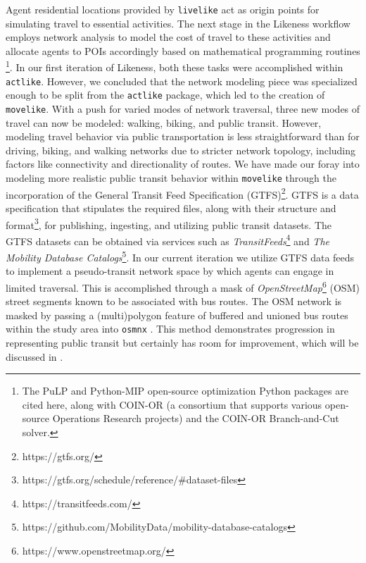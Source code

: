Agent residential locations provided by \texttt{livelike} act as origin points for simulating travel to essential activities. 
The next stage in the Likeness workflow employs network analysis to model the cost of travel to these activities \cite{OpenStreetMap, osmnx_CEUS_2017, foti_generalized_2012} and allocate agents to POIs accordingly based on mathematical programming routines \cite{mitchell_pulp_2011, santos_mixed_2020, lougee_coin_2003, forrest_coinorcbc_2023}\footnote{The PuLP and Python-MIP open-source optimization Python packages are cited here, along with COIN-OR (a consortium that supports various open-source Operations Research projects) and the COIN-OR Branch-and-Cut solver.}. In our first iteration of Likeness, both these tasks were accomplished within \texttt{actlike}. However, we concluded that the network modeling piece was specialized enough to be split from the \texttt{actlike} package, which led to the creation of \texttt{movelike}. With a push for varied modes of network traversal, three new modes of travel can now be modeled: walking, biking, and public transit. However, modeling travel behavior via public transportation is less straightforward than for driving, biking, and walking networks due to stricter network topology, including factors like connectivity and directionality of routes. We have made our foray into modeling more realistic public transit behavior within \texttt{movelike} through the incorporation of the General Transit Feed Specification (GTFS)\footnote{https://gtfs.org/}. GTFS is a data specification that stipulates the required files, along with their structure and format\footnote{https://gtfs.org/schedule/reference/\#dataset-files}, for publishing, ingesting, and utilizing public transit datasets. The GTFS datasets can be obtained via services such as \textit{TransitFeeds}\footnote{https://transitfeeds.com/} and \textit{The Mobility Database Catalogs}\footnote{https://github.com/MobilityData/mobility-database-catalogs}. In our current iteration we utilize GTFS data feeds to implement a pseudo-transit network space by which agents can engage in limited traversal. This is accomplished through a mask of \textit{OpenStreetMap}\footnote{https://www.openstreetmap.org/} (OSM) street segments known to be associated with bus routes. The OSM network is masked by passing a (multi)polygon feature of buffered and unioned bus routes within the study area into \texttt{osmnx} \cite{osmnx_CEUS_2017}. This method demonstrates progression in representing public transit but certainly has room for improvement, which will be discussed in .


